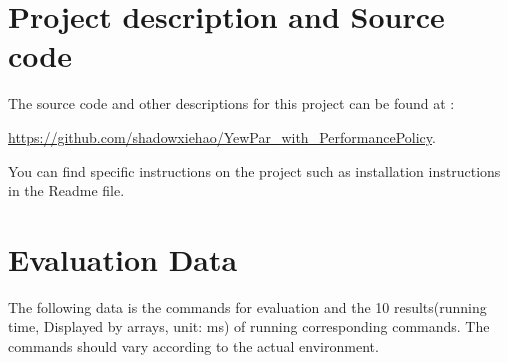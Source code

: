 \documentclass{mproj}
\begin{document}
\section{Project description and Source code}\label{appendix:note}

The source code and other descriptions for this project can be found at :

\url{https://github.com/shadowxiehao/YewPar_with_PerformancePolicy}.

You can find specific instructions on the project such as installation instructions in the Readme file.

\section{Evaluation Data}\label{appendix:data}

The following data is the commands for evaluation and the 10 results(running time, Displayed by arrays, unit: ms) of running corresponding commands.
The commands should vary according to the actual environment.
\end{document}
